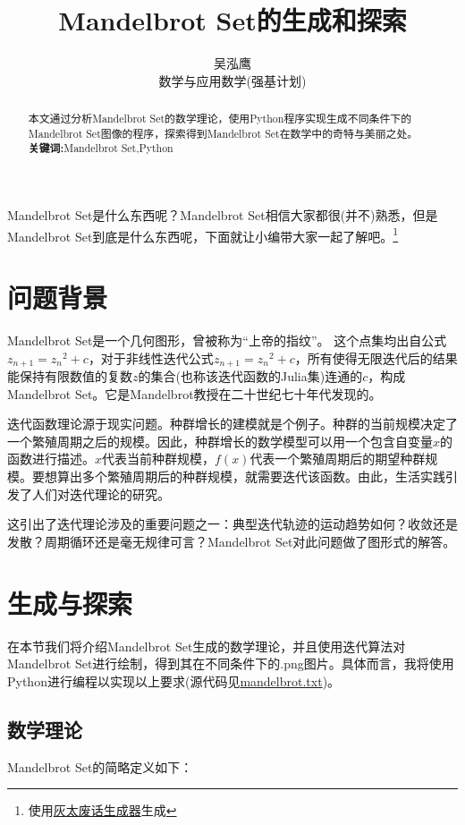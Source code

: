 \documentclass[a4paper]{ctexart}
\author{吴泓鹰\\数学与应用数学(强基计划)\quad3210101890}
\title{Mandelbrot Set的生成和探索}
\begin{document}
\maketitle	

\begin{abstract}
	本文通过分析Mandelbrot Set的数学理论，使用Python程序实现生成不同条件下的Mandelbrot Set图像的程序，探索得到Mandelbrot Set在数学中的奇特与美丽之处。\\
	\textbf{关键词:}Mandelbrot Set,Python
\end{abstract}	

Mandelbrot Set是什么东西呢？Mandelbrot Set相信大家都很(并不)熟悉，但是Mandelbrot Set到底是什么东西呢，下面就让小编带大家一起了解吧。\footnote{使用\href{https://www.pslkzs.com/feihua/feihua.php}{灰太废话生成器}生成}

\section{问题背景}
Mandelbrot Set是一个几何图形，曾被称为“上帝的指纹”。 这个点集均出自公式$z_{n+1}={z_n}^2+c$，对于非线性迭代公式$z_{n+1}={z_n}^2+c$，所有使得无限迭代后的结果能保持有限数值的复数$z$的集合(也称该迭代函数的Julia集)连通的$c$，构成Mandelbrot Set。它是Mandelbrot教授在二十世纪七十年代发现的。\cite{mandelbrotsetbaidu}

迭代函数理论源于现实问题。种群增长的建模就是个例子。种群的当前规模决定了一个繁殖周期之后的规模。因此，种群增长的数学模型可以用一个包含自变量$x$的函数进行描述。$x$代表当前种群规模，$f(x)$代表一个繁殖周期后的期望种群规模。要想算出多个繁殖周期后的种群规模，就需要迭代该函数。由此，生活实践引发了人们对迭代理论的研究。

这引出了迭代理论涉及的重要问题之一：典型迭代轨迹的运动趋势如何？收敛还是发散？周期循环还是毫无规律可言？Mandelbrot Set对此问题做了图形式的解答。\cite{mandelbrotsetzhihu}

\section{生成与探索}
在本节我们将介绍Mandelbrot Set生成的数学理论，并且使用迭代算法对Mandelbrot Set进行绘制，得到其在不同条件下的.png图片。具体而言，我将使用Python进行编程以实现以上要求(源代码见\href{run:./src/py/mandelbrot.txt}{mandelbrot.txt})\cite{mandelbrotsetpython}。

\subsection{数学理论}
Mandelbrot Set的简略定义如下：
\end{document}
